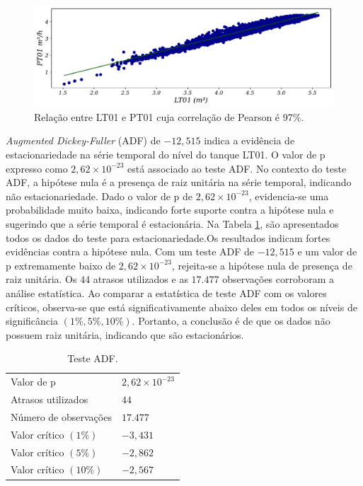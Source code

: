 \begin{figure}[!htb]
	\centering
	\caption{Relação entre LT01 e PT01 cuja correlação de Pearson é 97\%.}
	\label{fig:lr-lt01-m3}
	\includegraphics[width=0.7\linewidth]{Resultados/Figuras/LR}
\end{figure}

\textit{Augmented Dickey-Fuller} (ADF) de $-12,515$ indica a evidência de estacionariedade na série temporal do nível do tanque LT01. 
O valor de p expresso como $2,62\times 10^{-23}$ está associado ao teste ADF. No contexto do teste ADF, a hipótese nula é a presença de raiz unitária na série temporal, indicando não estacionariedade. Dado o valor de p de $2,62\times 10^{-23}$, evidencia-se uma probabilidade muito baixa, indicando forte suporte contra a hipótese nula e sugerindo que a série temporal é estacionária. Na Tabela \ref{tb:adf}, são apresentados todos os dados do teste para estacionariedade.Os resultados indicam fortes evidências contra a hipótese nula. Com um teste ADF de $-12,515 $ e um valor de p extremamente baixo de $2,62 \times 10^{-23}$, rejeita-se a hipótese nula de presença de raiz unitária. Os $44$ atrasos utilizados e as $17.477$ observações corroboram a análise estatística. Ao comparar a estatística de teste ADF com os valores críticos, observa-se que está significativamente abaixo deles em todos os níveis de significância $(1\%, 5\%, 10\%)$. Portanto, a conclusão é de que os dados não possuem raiz unitária, indicando que são estacionários.

\begin{table}[!htb]
	\centering
	\caption{Teste ADF.}\label{tb:adf}
	\begin{tabular}{ll}
		\hline
		Valor de p & $2,62 \times 10^{-23}$ \\
		Atrasos utilizados & $44$ \\
		Número de observações & $17.477$ \\
		Valor crítico $(1\%)$ & $-3,431$ \\
		Valor crítico $(5\%)$ & $-2,862$ \\
		Valor crítico $(10\%)$ & $-2,567$ \\
		\hline
	\end{tabular}
\end{table}


